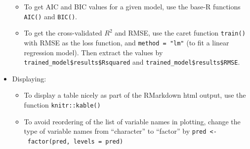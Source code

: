 \documentclass[
]{book}
\begin{document}
\begin{itemize}
  \begin{itemize}
  \item
    To get AIC and BIC values for a given model, use the base-R functions \texttt{AIC()} and \texttt{BIC()}.
  \item
    To get the cross-validated \(R^2\) and RMSE, use the caret function \texttt{train()} with RMSE as the loss function, and \texttt{method\ =\ "lm"} (to fit a linear regression model). Then extract the values by \texttt{trained\_model\$results\$Rsquared} and \texttt{trained\_model\$results\$RMSE}.
  \end{itemize}
\item
  Displaying:

  \begin{itemize}
  \item
    To display a table nicely as part of the RMarkdown html output, use the function \texttt{knitr::kable()}
  \item
    To avoid reordering of the list of variable names in plotting, change the type of variable names from ``character'' to ``factor'' by \texttt{pred\ \textless{}-\ factor(pred,\ levels\ =\ pred)}
  \end{itemize}
\end{itemize}
\end{document}
